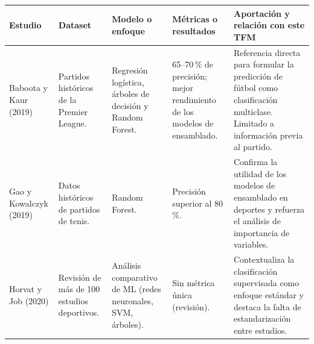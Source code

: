\begin{table}[H]
    \centering
    \scriptsize
    \renewcommand{\arraystretch}{1.25}
    \begin{tabularx}{\textwidth}{|p{2.4cm}|p{2.5cm}|p{2.6cm}|p{2.2cm}|X|}
        \hline
        \textbf{Estudio}                                                                 & \textbf{Dataset} & \textbf{Modelo o enfoque} & \textbf{Métricas o resultados} & \textbf{Aportación y relación con este TFM} \\
        \hline

        Baboota y Kaur (2019)                                                            &
        Partidos históricos de la Premier League.                                        &
        Regresión logística, árboles de decisión y Random Forest.                        &
        65--70\,\% de precisión; mejor rendimiento de los modelos de ensamblado.         &
        Referencia directa para formular la predicción de fútbol como clasificación multiclase. Limitado a información previa al partido.                                                                              \\
        \hline

        Gao y Kowalczyk (2019)                                                           &
        Datos históricos de partidos de tenis.                                           &
        Random Forest.                                                                   &
        Precisión superior al 80\,\%.                                                    &
        Confirma la utilidad de los modelos de ensamblado en deportes y refuerza el análisis de importancia de variables.                                                                                              \\
        \hline

        Horvat y Job (2020)                                                              &
        Revisión de más de 100 estudios deportivos.                                      &
        Análisis comparativo de ML (redes neuronales, SVM, árboles).                     &
        Sin métrica única (revisión).                                                    &
        Contextualiza la clasificación supervisada como enfoque estándar y destaca la falta de estandarización entre estudios.                                                                                         \\
        \hline


\end{tabularx}
\end{table}
